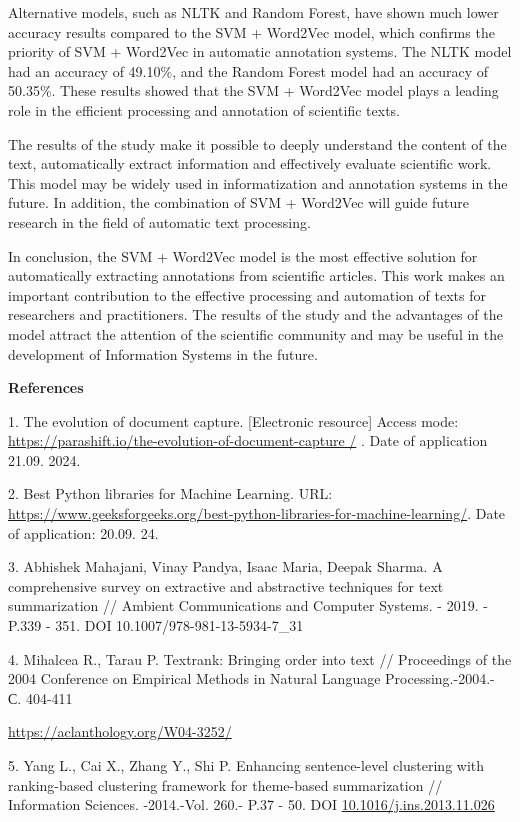 \documentclass[
]{article}
\begin{document}
Alternative models, such as NLTK and Random Forest, have shown much
lower accuracy results compared to the SVM + Word2Vec model, which
confirms the priority of SVM + Word2Vec in automatic annotation systems.
The NLTK model had an accuracy of 49.10\%, and the Random Forest model
had an accuracy of 50.35\%. These results showed that the SVM + Word2Vec
model plays a leading role in the efficient processing and annotation of
scientific texts.

The results of the study make it possible to deeply understand the
content of the text, automatically extract information and effectively
evaluate scientific work. This model may be widely used in
informatization and annotation systems in the future. In addition, the
combination of SVM + Word2Vec will guide future research in the field of
automatic text processing.

In conclusion, the SVM + Word2Vec model is the most effective solution
for automatically extracting annotations from scientific articles. This
work makes an important contribution to the effective processing and
automation of texts for researchers and practitioners. The results of
the study and the advantages of the model attract the attention of the
scientific community and may be useful in the development of Information
Systems in the future.

\textbf{References}

1. The evolution of document capture. {[}Electronic resource{]} Access
mode:
\href{https://parashift.io/the-evolution-of-document-capture\%20/}{https://parashift.io/the-evolution-of-document-capture
/} . Date of application 21.09. 2024.

2. Best Python libraries for Machine Learning. URL:
\url{https://www.geeksforgeeks.org/best-python-libraries-for-machine-learning/}.
Date of application: 20.09. 24.

3. Abhishek Mahajani, Vinay Pandya, Isaac Maria, Deepak Sharma. A
comprehensive survey on extractive and abstractive techniques for text
summarization // Ambient Communications and Computer Systems. - 2019. -
P.339 - 351. DOI 10.1007/978-981-13-5934-7\_31

4. Mihalcea R., Tarau P. Textrank: Bringing order into text //
Proceedings of the 2004 Conference on Empirical Methods in Natural
Language Processing.-2004.- С. 404-411

\url{https://aclanthology.org/W04-3252/}

5. Yang L., Cai X., Zhang Y., Shi P. Enhancing sentence-level clustering
with ranking-based clustering framework for theme-based summarization //
Information Sciences. -2014.-Vol. 260.- P.37 - 50. DOI
\href{http://dx.doi.org/10.1016/j.ins.2013.11.026}{10.1016/j.ins.2013.11.026}
\end{document}
